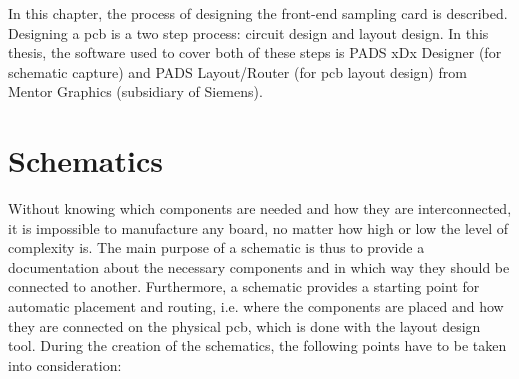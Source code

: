 In this chapter, the process of designing the front-end sampling card is described.
Designing a \gls{pcb} is a two step process: circuit design and layout design.
In this thesis, the software used to cover both of these steps is PADS xDx Designer (for schematic capture) and PADS Layout/Router (for \gls{pcb} layout design) from Mentor Graphics (subsidiary of Siemens).

\section{Schematics}
Without knowing which components are needed and how they are interconnected, it is impossible to manufacture any board, no matter how high or low the level of complexity is.
The main purpose of a schematic is thus to provide a documentation about the necessary components and in which way they should be connected to another.
Furthermore, a schematic provides a starting point for automatic placement and routing, i.e. where the components are placed and how they are connected on the physical \gls{pcb}, which is done with the layout design tool.
During the creation of the schematics, the following points have to be taken into consideration:
